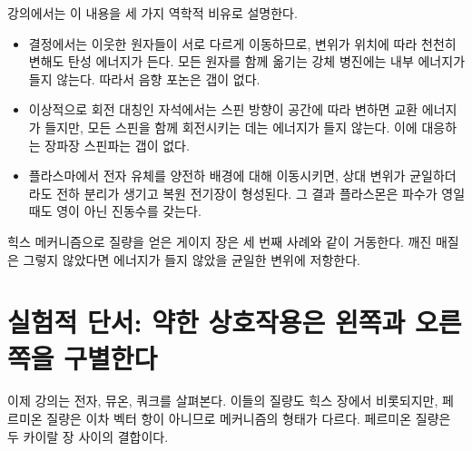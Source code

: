 강의에서는 이 내용을 세 가지 역학적 비유로 설명한다.

\begin{itemize}
  \item 결정에서는 이웃한 원자들이 서로 다르게 이동하므로, 변위가 위치에 따라 천천히 변해도 탄성 에너지가 든다. 모든 원자를 함께 옮기는 강체 병진에는 내부 에너지가 들지 않는다. 따라서 음향 포논은 갭이 없다.
  \item 이상적으로 회전 대칭인 자석에서는 스핀 방향이 공간에 따라 변하면 교환 에너지가 들지만, 모든 스핀을 함께 회전시키는 데는 에너지가 들지 않는다. 이에 대응하는 장파장 스핀파는 갭이 없다.
  \item 플라스마에서 전자 유체를 양전하 배경에 대해 이동시키면, 상대 변위가 균일하더라도 전하 분리가 생기고 복원 전기장이 형성된다. 그 결과 플라스몬은 파수가 영일 때도 영이 아닌 진동수를 갖는다.
\end{itemize}

힉스 메커니즘으로 질량을 얻은 게이지 장은 세 번째 사례와 같이 거동한다. 깨진 매질은 그렇지 않았다면 에너지가 들지 않았을 균일한 변위에 저항한다.

\begin{classroomqa}\end{classroomqa}

\begin{classroomqa}
\end{classroomqa}

\section{실험적 단서: 약한 상호작용은 왼쪽과 오른쪽을 구별한다}

이제 강의는 전자, 뮤온, 쿼크를 살펴본다. 이들의 질량도 힉스 장에서 비롯되지만, 페르미온 질량은 이차 벡터 항이 아니므로 메커니즘의 형태가 다르다. 페르미온 질량은 두 카이랄 장 사이의 결합이다.

